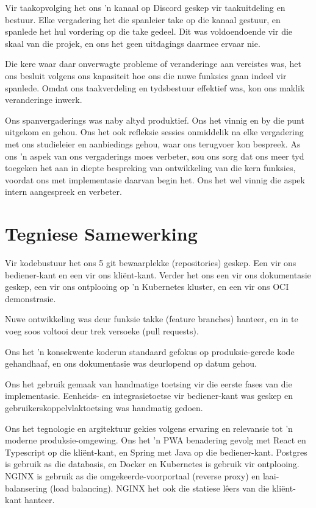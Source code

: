 Vir taakopvolging het ons 'n kanaal op Discord geskep vir taakuitdeling en
bestuur. Elke vergadering het die spanleier take op die kanaal gestuur, en
spanlede het hul vordering op die take gedeel. Dit was voldoendoende vir die
skaal van die projek, en ons het geen uitdagings daarmee ervaar nie.

Die kere waar daar onverwagte probleme of veranderinge aan vereistes was, het ons besluit volgens ons kapasiteit hoe ons die nuwe funksies gaan indeel vir spanlede. Omdat ons taakverdeling en tydsbestuur effektief was, kon ons maklik veranderinge inwerk.

Ons spanvergaderings was naby altyd produktief. Ons het vinnig en by die punt
uitgekom en gehou. Ons het ook refleksie sessies onmiddelik na elke vergadering
met ons studieleier en aanbiedings gehou, waar ons terugvoer kon bespreek. As
ons 'n aspek van ons vergaderings moes verbeter, sou ons sorg dat ons meer tyd
toegeken het aan in diepte bespreking van ontwikkeling van die kern funksies,
voordat ons met implementasie daarvan begin het. Ons het wel vinnig die aspek
intern aangespreek en verbeter.

\section{Tegniese Samewerking}

Vir kodebustuur het ons 5 git bewaarplekke (repositories) geskep. Een vir ons
bediener-kant en een vir ons kliënt-kant. Verder het ons een vir ons
dokumentasie geskep, een vir ons ontplooing op 'n Kubernetes kluster, en een vir
ons OCI demonstrasie. 

Nuwe ontwikkeling was deur funksie takke (feature branches) hanteer, en in te
voeg soos voltooi deur trek versoeke (pull requests).

Ons het 'n konsekwente koderun standaard gefokus op produksie-gerede kode
gehandhaaf, en ons dokumentasie was deurlopend op datum gehou.

Ons het gebruik gemaak van handmatige toetsing vir die eerste fases van die
implementasie. Eenheids- en integrasietoetse vir bediener-kant was geskep en
gebruikerskoppelvlaktoetsing was handmatig gedoen.

Ons het tegnologie en argitektuur gekies volgens ervaring en relevansie tot 'n
moderne produksie-omgewing. Ons het 'n PWA benadering gevolg met React en
Typescript op die kliënt-kant, en Spring met Java op die bediener-kant. Postgres
is gebruik as die databasis, en Docker en Kubernetes is gebruik vir ontplooing.
NGINX is gebruik as die omgekeerde-voorportaal (reverse proxy) en
laai-balansering (load balancing). NGINX het ook die statiese lêers van die
kliënt-kant hanteer. 


